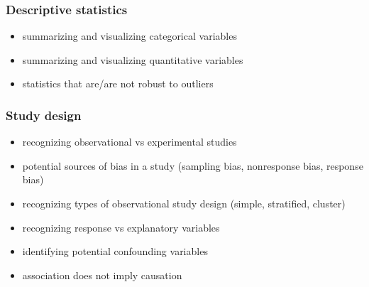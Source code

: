 \begin{frame}[label=descriptive]
\frametitle{Descriptive statistics}
\begin{itemize}
    \item
    summarizing and visualizing categorical variables
    \item
    summarizing and visualizing quantitative variables
    \item
    statistics that are/are not robust to outliers
\end{itemize}
\begin{flushright}
\hyperlink{topics}{}
\end{flushright}
\end{frame}


\begin{frame}[label=studydesign]
\frametitle{Study design}
\begin{itemize}
    \item
    recognizing observational vs experimental studies
    \item
    potential sources of bias in a study (sampling bias, nonresponse bias, response bias)
      \item
    recognizing types of observational study design (simple, stratified, cluster)
    \item
    recognizing response vs explanatory variables
    \item
    identifying potential confounding variables
    \item
    association does not imply causation
\end{itemize}
\begin{flushright}
\hyperlink{topics}{}
\end{flushright}
\end{frame}

